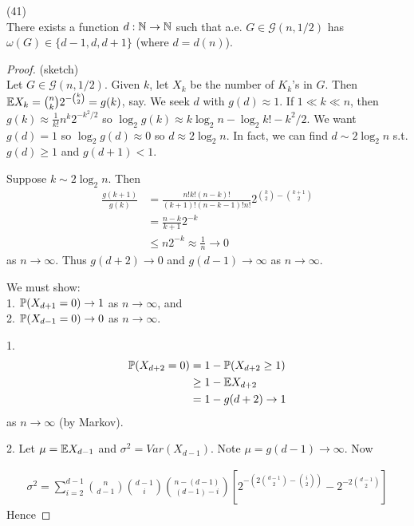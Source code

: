 \documentclass[a4paper]{article}
\begin{document}
\begin{thm} (41)\\
There exists a function $d:\N \to \N$ such that a.e. $G \in \mathcal{G}(n,1/2)$ has $\omega(G) \in \{d-1,d,d+1\}$ (where $d=d(n)$).
\begin{proof} (sketch)\\
Let $G \in \mathcal{G}(n,1/2)$. Given $k$, let $X_k$ be the number of $K_k$'s in $G$. Then $\E X_k = {n \choose k} 2^{-{k \choose 2}} = g(k)$, say. We seek $d$ with $g(d) \approx 1$. If $1 \ll k \ll n$, then $g(k) \approx \frac{1}{k!} n^k 2^{-k^2/2}$ so $\log_2 g(k) \approx k\log_2 n - \log_2 k! - k^2/2$. We want $g(d) = 1$ so $\log_2 g(d) \approx 0$ so $d \approx 2 \log_2 n$. In fact, we can find $d \sim 2 \log_2 n$ s.t. $g(d) \geq 1$ and $g(d+1) < 1$.

Suppose $k \sim 2\log_2 n$. Then 
\begin{equation*}
\begin{aligned}
\frac{g(k+1)}{g(k)} &= \frac{n!k!(n-k)!}{(k+1)!(n-k-1)!n!} 2^{{k\choose 2}-{{k+1}\choose 2}}\\
&= \frac{n-k}{k+1}2^{-k} \\
&\leq n2^{-k} \approx \frac{1}{n} \to 0
\end{aligned}
\end{equation*}
as $n \to \infty$. Thus $g(d+2) \to 0$ and $g(d-1) \to \infty$ as $n \to \infty$.

We must show:\\
1. $\P(X_{d+1} = 0) \to 1$ as $n \to \infty$, and\\
2. $\P(X_{d-1} = 0) \to 0$ as $n \to \infty$.

1.
\begin{equation*}
\begin{aligned}
\P(X_{d+2} = 0) &= 1-\P(X_{d+2} \geq 1)\\
&\geq 1-\E X_{d+2}\\
&= 1-g(d+2) \to 1
\end{aligned}
\end{equation*}
as $n \to \infty$ (by Markov).

2. Let $\mu = \E X_{d-1}$ and $\sigma^2 = Var(X_{d-1})$. Note $\mu = g(d-1) \to \infty$. Now

\begin{equation*}
\begin{aligned}
\sigma^2 = \sum_{i=2}^{d-1} {n \choose {d-1}} {{d-1} \choose i}{{n-(d-1)} \choose {(d-1)-i}}\left[2^{-(2{{d-1} \choose 2}-{i \choose 2})} - 2^{-2{{d-1} \choose 2}}\right]
\end{aligned}
\end{equation*}
Hence


\end{proof}
\end{thm}
\end{document}
